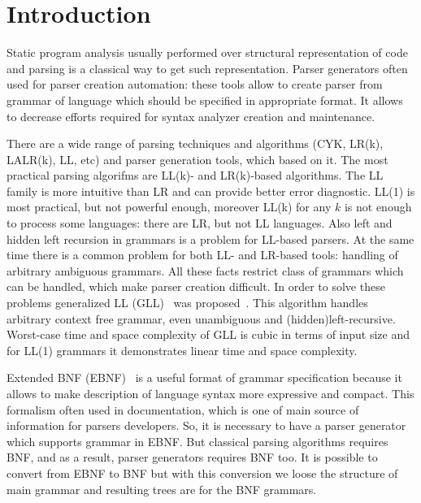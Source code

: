 \documentclass[runningheads,a4paper]{llncs}
\begin{document}
\section{Introduction}%

Static program analysis usually performed over structural representation of code and parsing is a classical way to get such representation.
Parser generators often used for parser creation automation: these tools allow to create parser from grammar of language which should be specified in appropriate format.
It allows to decrease efforts required for syntax analyzer creation and maintenance.

There are a wide range of parsing techniques and algorithms (CYK, LR(k), LALR(k), LL, etc) and parser generation tools, which based on it. 
The most practical parsing algorifms are LL(k)- and LR(k)-based algorithms.
The LL family is more intuitive than LR and can provide better error diagnostic.
LL(1) is most practical, but not powerful enough, moreover LL(k) for any $k$ is not enough to process some languages: there are LR, but not LL languages.
Also left and hidden left recursion in grammars is a problem for LL-based parsers.
At the same time there is a common problem for both LL- and LR-based tools: handling of arbitrary ambiguous grammars.
All these facts restrict class of grammars which can be handled, which make parser creation difficult. 
In order to solve these problems generalized LL (GLL)~\cite{scott2010gll} was proposed~\cite{scott2010gll}. 
This algorithm handles arbitrary context free grammar, even unambiguous and (hidden)left-recursive.
Worst-case time and space complexity of GLL is cubic in terms of input size and for LL(1) grammars it demonstrates linear time and space complexity.

Extended BNF (EBNF)~\cite{EBNFISO} is a useful format of grammar specification because it allows to make description of language syntax more expressive and compact. 
This formalism often used in documentation, which is one of main source of information for parsers developers.
So, it is necessary to have a parser generator which supports grammar in EBNF.
But classical parsing algorithms requires BNF, and as a result, parser generators requires BNF too.
It is possible to convert from EBNF to BNF but with this conversion we loose the structure of main grammar and resulting trees are for the BNF grammars.
\end{document}
